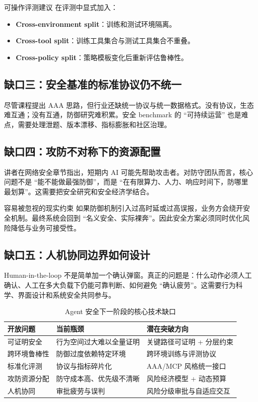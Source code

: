 \documentclass[a4paper]{article}
\begin{document}
\begin{knowledgebox}{可操作评测建议}
在评测中显式加入：
\begin{itemize}
    \item \textbf{Cross-environment split}：训练和测试环境隔离。
    \item \textbf{Cross-tool split}：训练工具集合与测试工具集合不重叠。
    \item \textbf{Cross-policy split}：策略模板变化后重新评估鲁棒性。
\end{itemize}
\end{knowledgebox}

\subsection{缺口三：安全基准的标准协议仍不统一}
尽管课程提出 AAA 思路，但行业还缺统一协议与统一数据格式。没有协议，生态难互通；没有互通，防御研究难积累。安全 benchmark 的 ``可持续运营'' 也是难点，需要处理泄题、版本漂移、指标膨胀和社区治理。

\subsection{缺口四：攻防不对称下的资源配置}
讲者在网络安全章节指出，短期内 AI 可能先帮助攻击者。对防守团队而言，核心问题不是 ``能不能做最强防御''，而是 ``在有限算力、人力、响应时间下，防哪里最划算''。这需要把安全研究和安全经济学结合。

\begin{warningbox}{容易被忽视的现实约束}
如果防御机制引入过高时延或过高误报，业务方会绕开安全机制。最终系统会回到 ``名义安全、实际裸奔''。因此安全方案必须同时优化风险降低与业务可接受性。
\end{warningbox}

\subsection{缺口五：人机协同边界如何设计}
Human-in-the-loop 不是简单加一个确认弹窗。真正的问题是：什么动作必须人工确认、人工在多大负载下仍能可靠判断、如何避免 ``确认疲劳''。这需要行为科学、界面设计和系统安全共同参与。

\begin{table}[H]
\centering
\begin{tabular}{p{2.9cm}p{3.6cm}p{3.9cm}}
\toprule
\textbf{开放问题} & \textbf{当前瓶颈} & \textbf{潜在突破方向} \\
\midrule
可证明安全 & 行为空间过大难以全量证明 & 关键路径可证明 + 分层约束 \\
跨环境鲁棒性 & 防御过度依赖特定环境 & 跨环境训练与评测协议 \\
标准化评测 & 协议与指标碎片化 & AAA/MCP 风格统一接口 \\
攻防资源分配 & 防守成本高、优先级不清晰 & 风险经济模型 + 动态预算 \\
人机协同 & 审批疲劳与误判 & 风险分级审批与自适应交互 \\
\bottomrule
\end{tabular}
\caption{Agent 安全下一阶段的核心技术缺口}
\end{table}
\end{document}
